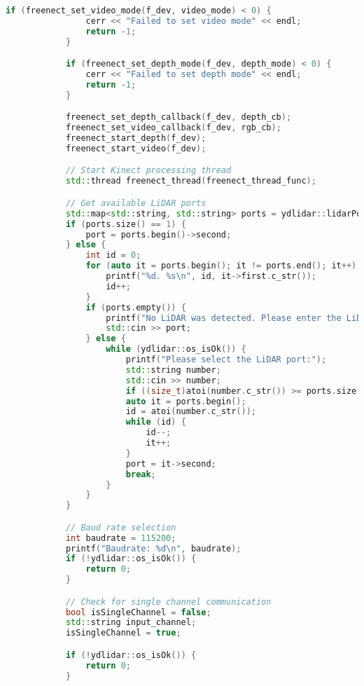 \begin{lstlisting}[language={C++}, caption={C\'odigo de ejemplo de Kinect y LiDAR}, label={fresd}]
            if (freenect_set_video_mode(f_dev, video_mode) < 0) {
                cerr << "Failed to set video mode" << endl;
                return -1;
            }

            if (freenect_set_depth_mode(f_dev, depth_mode) < 0) {
                cerr << "Failed to set depth mode" << endl;
                return -1;
            }

            freenect_set_depth_callback(f_dev, depth_cb);
            freenect_set_video_callback(f_dev, rgb_cb);
            freenect_start_depth(f_dev);
            freenect_start_video(f_dev);

            // Start Kinect processing thread
            std::thread freenect_thread(freenect_thread_func);

            // Get available LiDAR ports
            std::map<std::string, std::string> ports = ydlidar::lidarPortList();
            if (ports.size() == 1) {
                port = ports.begin()->second;
            } else {
                int id = 0;
                for (auto it = ports.begin(); it != ports.end(); it++) {
                    printf("%d. %s\n", id, it->first.c_str());
                    id++;
                }
                if (ports.empty()) {
                    printf("No LiDAR was detected. Please enter the LiDAR serial port:");
                    std::cin >> port;
                } else {
                    while (ydlidar::os_isOk()) {
                        printf("Please select the LiDAR port:");
                        std::string number;
                        std::cin >> number;
                        if ((size_t)atoi(number.c_str()) >= ports.size()) continue;
                        auto it = ports.begin();
                        id = atoi(number.c_str());
                        while (id) {
                            id--;
                            it++;
                        }
                        port = it->second;
                        break;
                    }
                }
            }

            // Baud rate selection
            int baudrate = 115200;
            printf("Baudrate: %d\n", baudrate); 
            if (!ydlidar::os_isOk()) {
                return 0;
            }

            // Check for single channel communication
            bool isSingleChannel = false;
            std::string input_channel;
            isSingleChannel = true;

            if (!ydlidar::os_isOk()) {
                return 0;
            }


\end{lstlisting}
